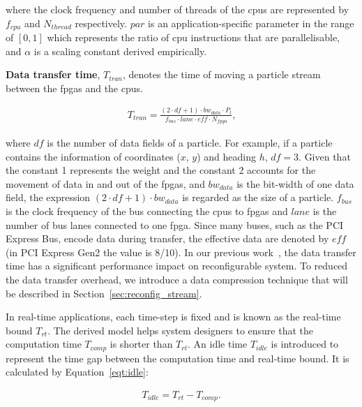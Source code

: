 where the clock frequency and number of threads of the \glspl{cpu} are represented by $f_{cpu}$ and $N_{thread}$ respectively.
$par$ is an application-specific parameter in the range of $[0,1]$ which represents the ratio of \gls{cpu} instructions that are parallelisable, and $\alpha$ is a scaling constant derived empirically.

\textbf{Data transfer time}, $T_{tran}$, denotes the time of moving a particle stream between the \glspl{fpga} and the \glspl{cpu}.

\begin{equation}
\begin{aligned}
T_{tran} = \frac{(2 \cdot df + 1) \cdot bw_{data} \cdot P_t}{f_{bus} \cdot lane \cdot eff \cdot N_{fpga}} \mbox{,}
\end{aligned}
\label{eqt:data}
\end{equation}

where $df$ is the number of data fields of a particle.
For example, if a particle contains the information of coordinates ($x$, $y$) and heading $h$, $df=3$.
Given that the constant 1 represents the weight and the constant 2 accounts for the movement of data in and out of the \glspl{fpga},
and $bw_{data}$ is the bit-width of one data field, the expression $(2 \cdot df + 1) \cdot bw_{data}$ is regarded as the size of a particle.
$f_{bus}$ is the clock frequency of the bus connecting the \glspl{cpu} to \glspl{fpga} and $lane$ is the number of bus lanes connected to one \gls{fpga}.
Since many buses, such as the PCI Express Bus, encode data during transfer, the effective data are denoted by $eff$ (in PCI Express Gen2 the value is 8/10).
In our previous work~\cite{chau13arc}, the data transfer time has a significant performance impact on reconfigurable system.
To reduced the data transfer overhead, we introduce a data compression technique that will be described in Section~\ref{sec:reconfig_stream}.

In real-time applications, each time-step is fixed and is known as the real-time bound $T_{rt}$.
The derived model helps system designers to ensure that the computation time $T_{comp}$ is shorter than $T_{rt}$.
An idle time $T_{idle}$ is introduced to represent the time gap between the computation time and real-time bound.
It is calculated by Equation~\ref{eqt:idle}:

\begin{equation}
\begin{aligned}
T_{idle} = T_{rt} - T_{comp} \mbox{.}
\end{aligned}
\label{eqt:idle}
\end{equation}

